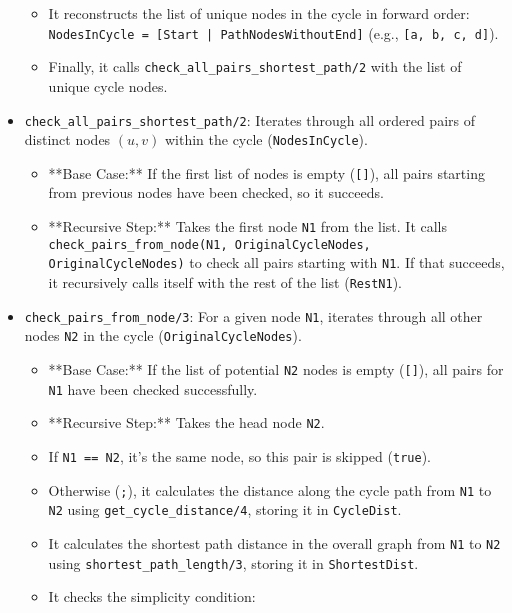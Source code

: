 \documentclass[12pt,a4paper]{article}
\begin{document}
\begin{itemize}
\begin{itemize}
            \item It reconstructs the list of unique nodes in the cycle in forward order: \texttt{NodesInCycle = [Start | PathNodesWithoutEnd]} (e.g., \texttt{[a, b, c, d]}).
            \item Finally, it calls \texttt{check\_all\_pairs\_shortest\_path/2} with the list of unique cycle nodes.
        \end{itemize}
    \item \texttt{check\_all\_pairs\_shortest\_path/2}: Iterates through all ordered pairs of distinct nodes $(u, v)$ within the cycle (\texttt{NodesInCycle}).
        \begin{itemize}
            \item **Base Case:** If the first list of nodes is empty (\texttt{[]}), all pairs starting from previous nodes have been checked, so it succeeds.
            \item **Recursive Step:** Takes the first node \texttt{N1} from the list. It calls \texttt{check\_pairs\_from\_node(N1, OriginalCycleNodes, OriginalCycleNodes)} to check all pairs starting with \texttt{N1}. If that succeeds, it recursively calls itself with the rest of the list (\texttt{RestN1}).
        \end{itemize}
    \item \texttt{check\_pairs\_from\_node/3}: For a given node \texttt{N1}, iterates through all other nodes \texttt{N2} in the cycle (\texttt{OriginalCycleNodes}).
        \begin{itemize}
            \item **Base Case:** If the list of potential \texttt{N2} nodes is empty (\texttt{[]}), all pairs for \texttt{N1} have been checked successfully.
            \item **Recursive Step:** Takes the head node \texttt{N2}.
                \item If \texttt{N1 == N2}, it's the same node, so this pair is skipped (\texttt{true}).
                \item Otherwise (\texttt{;}), it calculates the distance along the cycle path from \texttt{N1} to \texttt{N2} using \texttt{get\_cycle\_distance/4}, storing it in \texttt{CycleDist}.
                \item It calculates the shortest path distance in the overall graph from \texttt{N1} to \texttt{N2} using \texttt{shortest\_path\_length/3}, storing it in \texttt{ShortestDist}.
                \item It checks the simplicity condition:

\end{itemize}
\end{itemize}
\end{document}
